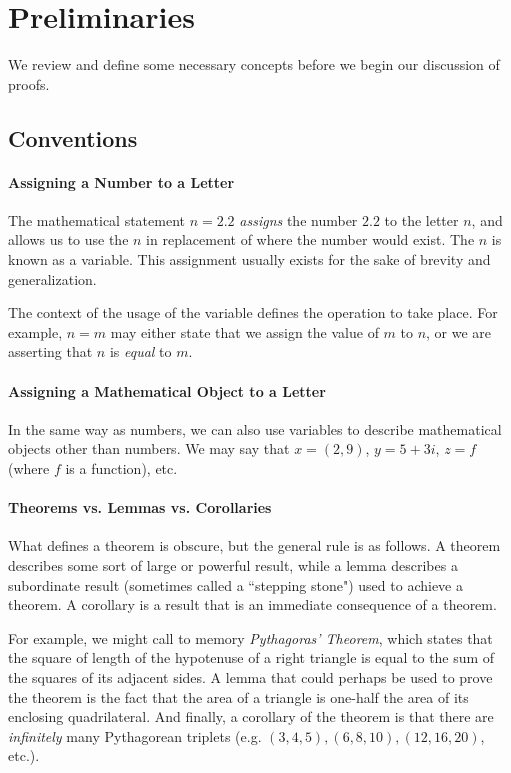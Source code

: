 \documentclass[../proofs.tex]{subfiles}
\begin{document}
\chapter{Preliminaries}
We review and define some necessary concepts before we begin our discussion of
proofs.

\section{Conventions}
  \subsubsection*{Assigning a Number to a Letter}
  The mathematical statement $n = 2.2$ \emph{assigns} the number $2.2$ to the
  letter $n$, and allows us to use the $n$ in replacement of where the number
  would exist. The $n$ is known as a variable. This assignment usually exists
  for the sake of brevity and generalization.

  The context of the usage of the variable defines the operation to take place.
  For example, $n = m$ may either state that we assign the value of $m$ to $n$,
  or we are asserting that $n$ is \emph{equal} to $m$.

  \subsubsection{Assigning a Mathematical Object to a Letter}
  In the same way as numbers, we can also use variables to describe mathematical
  objects other than numbers. We may say that $x = (2, 9)$, $y = 5 + 3i$,
  $z = f$ (where $f$ is a function), etc.

  \subsubsection*{Theorems vs. Lemmas vs. Corollaries}
  What defines a theorem is obscure, but the general rule is as follows.
  A theorem describes some sort of large or powerful result, while a lemma
  describes a subordinate result (sometimes called a ``stepping stone") used to
  achieve a theorem. A corollary is a result that is an immediate consequence
  of a theorem.

  For example, we might call to memory \emph{Pythagoras' Theorem}, which states
  that the square of length of the hypotenuse of a right triangle is equal to
  the sum of the squares of its adjacent sides. A lemma that could perhaps be
  used to prove the theorem is the fact that the area of a triangle is one-half
  the area of its enclosing quadrilateral. And finally, a corollary of the
  theorem is that there are \emph{infinitely} many Pythagorean triplets
  (e.g. $(3, 4, 5), (6, 8, 10), (12, 16, 20)$, etc.).
\end{document}
